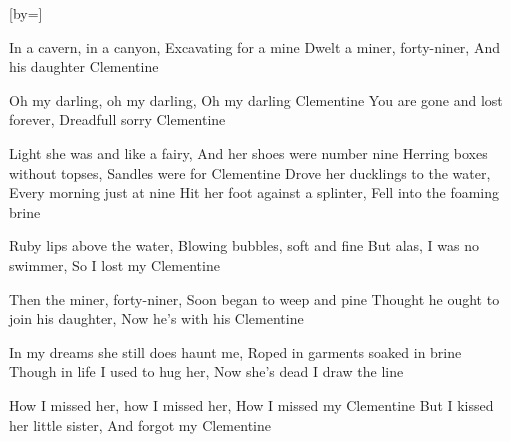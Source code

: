 

[by=]



\beginverse
In a cavern, in a canyon, \brk  Excavating for a mine
Dwelt a miner, forty-niner, \brk  And his daughter Clementine
\endverse

\beginchorus
Oh my darling, oh my darling, \brk  Oh my darling Clementine
You are gone and lost forever, \brk  Dreadfull sorry Clementine
\endchorus

\beginverse
Light she was and like a fairy, \brk  And her shoes were number nine
Herring boxes without topses, \brk  Sandles were for Clementine
Drove her ducklings to the water, \brk  Every morning just at nine
Hit her foot against a splinter, \brk  Fell into the foaming brine
\endverse

\beginverse
Ruby lips above the water, \brk  Blowing bubbles, soft and fine
But alas, I was no swimmer, \brk  So I lost my Clementine
\endverse

\beginverse
Then the miner, forty-niner, \brk  Soon began to weep and pine
Thought he ought to join his daughter, \brk  Now he's with his Clementine
\endverse

\beginverse
In my dreams she still does haunt me, \brk  Roped in garments soaked in brine
Though in life I used to hug her, \brk  Now she's dead I draw the line
\endverse

\beginverse
How I missed her, how I missed her, \brk  How I missed my Clementine
But I kissed her little sister, \brk  And forgot my Clementine
\endverse




\endsong

